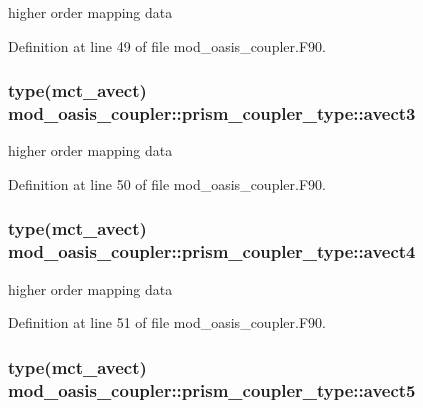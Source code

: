 higher order mapping data 



Definition at line 49 of file mod\+\_\+oasis\+\_\+coupler.\+F90.

\hypertarget{structmod__oasis__coupler_1_1prism__coupler__type_ac923618471bb31902062be4107d9bbf3}{
\subsubsection[{avect3}]{\setlength{\rightskip}{0pt plus 5cm}type(mct\+\_\+avect) mod\+\_\+oasis\+\_\+coupler\+::prism\+\_\+coupler\+\_\+type\+::avect3\hspace{0.3cm}{\ttfamily [private]}}}\label{structmod__oasis__coupler_1_1prism__coupler__type_ac923618471bb31902062be4107d9bbf3}


higher order mapping data 



Definition at line 50 of file mod\+\_\+oasis\+\_\+coupler.\+F90.

\hypertarget{structmod__oasis__coupler_1_1prism__coupler__type_a478dda1acb9e270efda23a7275b21b83}{
\subsubsection[{avect4}]{\setlength{\rightskip}{0pt plus 5cm}type(mct\+\_\+avect) mod\+\_\+oasis\+\_\+coupler\+::prism\+\_\+coupler\+\_\+type\+::avect4\hspace{0.3cm}{\ttfamily [private]}}}\label{structmod__oasis__coupler_1_1prism__coupler__type_a478dda1acb9e270efda23a7275b21b83}


higher order mapping data 



Definition at line 51 of file mod\+\_\+oasis\+\_\+coupler.\+F90.

\hypertarget{structmod__oasis__coupler_1_1prism__coupler__type_a939d1987d5c66c2352ff40709f255980}{
\subsubsection[{avect5}]{\setlength{\rightskip}{0pt plus 5cm}type(mct\+\_\+avect) mod\+\_\+oasis\+\_\+coupler\+::prism\+\_\+coupler\+\_\+type\+::avect5\hspace{0.3cm}{\ttfamily [private]}}}\label{structmod__oasis__coupler_1_1prism__coupler__type_a939d1987d5c66c2352ff40709f255980}


